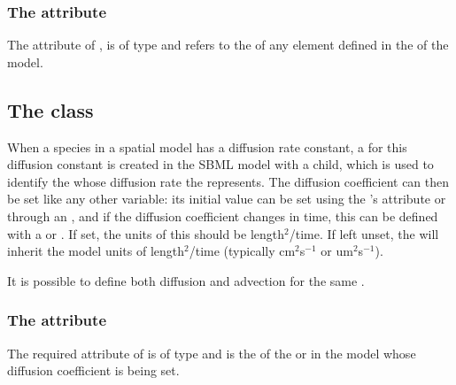 \subsubsection{The \fixttspace{} attribute}
The  attribute of \SpatialSymbolReference, is of type  and refers to the  of any element  defined in the \Geometry of the model.

\subsection{The  class}
\label{diffusioncoefficient-class}
When a species in a spatial model has a diffusion rate constant, a \Parameter for this diffusion constant is created in the SBML model with a \DiffusionCoefficient child, which is used to identify the \Species whose diffusion rate the \Parameter represents. The diffusion coefficient can then be set like any other variable:  its initial value can be set using the \Parameter's  attribute or through an \InitialAssignment, and if the diffusion coefficient changes in time, this can be defined with a \Rule or \Event. If set, the units of this \Parameter should be length$^2$/time.  If left unset, the \DiffusionCoefficient will inherit the model units of length$^2$/time (typically cm$^2$s$^{-1}$ or um$^2$s$^{-1}$).


It is possible to define both diffusion and advection for the same \Species.

\subsubsection{The \fixttspace{} attribute}
The required  attribute of \DiffusionCoefficient is of type  and is the  of the \Species or \Parameter in the model whose diffusion coefficient is being set.

